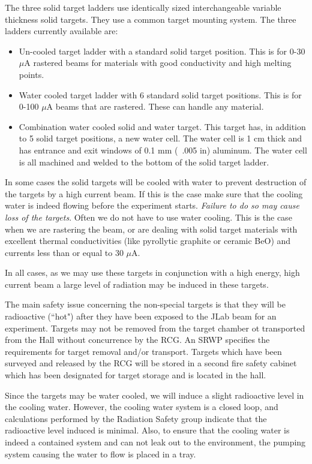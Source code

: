 {The three solid target ladders use identically sized interchangeable
variable thickness solid targets.  They use a common target mounting
system.  The three ladders currently available are:

\begin{itemize}
\item{Un-cooled target ladder with a standard solid target position.
This is for 0-30 $\mu$A rastered beams for materials with good
conductivity and high melting points.}
\item{Water cooled target ladder with 6 standard solid target
positions.  This is for 0-100 $\mu$A beams that are rastered.  These
can handle any material.}
\item{Combination water cooled solid and water target.  This target
has, in addition to 5 solid target positions, a new water cell.
The water cell is 1 cm thick and has entrance and exit windows of 0.1
mm (~.005 in) aluminum.  The water cell is all machined and welded to
the bottom of the solid target ladder.}
\end{itemize}

In some cases the solid targets will be cooled with water to prevent
destruction of the targets by a high current beam. If this is the case
make sure that the
cooling water is indeed flowing before the experiment starts.
{\sl Failure to do so may cause loss of the targets}. Often we
do not have to use water cooling. This is the case when we are
rastering the beam, or are dealing with solid target
materials with excellent thermal conductivities (like pyrollytic
graphite or ceramic BeO) and currents less than or equal to 30 $\mu$A.

In all cases, as we may use these targets in conjunction with a high
energy, high current beam a large level of radiation may be induced
in these targets.

The main safety issue concerning the non-special targets is that
they will be radioactive (``hot") after they have been
exposed to the JLab beam for an experiment.
Targets may not be removed from the target chamber ot transported from the Hall without 
concurrence by the RCG. An SRWP specifies the requirements for target removal and/or 
transport. Targets which have been surveyed and released by the RCG will be stored in a 
second fire safety cabinet which has been designated for target storage and is located in 
the hall.

Since the targets may be water cooled, we will induce a slight
radioactive level in the cooling water. However, the cooling water
system is a closed loop, and calculations performed by the Radiation
Safety group indicate that the radioactive level induced is minimal.
Also, to ensure that the cooling water is indeed a contained system
and can not leak out to the environment, the pumping system causing
the water to flow is placed in a tray.

}
